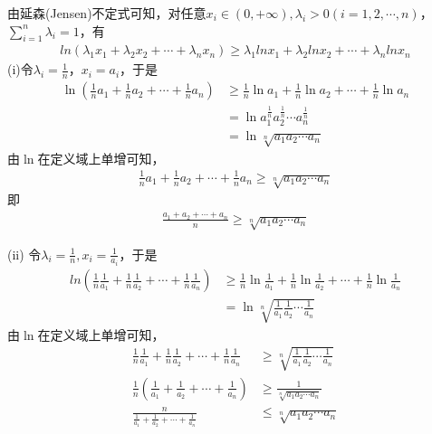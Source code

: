 \documentclass{article}
\begin{document}
由延森(Jensen)不定式可知，对任意$x_i \in (0, +\infty), \lambda_i > 0 (i = 1, 2, \cdots, n)$，
$\sum\limits_{i = 1}^n \lambda_i = 1$，有
\begin{align*}
  ln (\lambda_1 x_1 + \lambda_2 x_2 + \cdots + \lambda_n x_n) \geq \lambda_1 ln x_1 + \lambda_2 ln x_2 + \cdots + \lambda_n ln x_n
\end{align*}
(i)令$\lambda_i = \frac{1}{n}$，$x_i = a_i$，于是
\begin{align*}
  \ln (\frac{1}{n} a_1 + \frac{1}{n} a_2 + \cdots + \frac{1}{n} a_n)
   & \geq \frac{1}{n} \ln a_1 + \frac{1}{n} \ln a_2 + \cdots + \frac{1}{n} \ln a_n \\
   & = \ln a_1^{\frac{1}{n}} a_2^{\frac{1}{n}} \cdots a_n^{\frac{1}{n}}            \\
   & = \ln \sqrt[n]{a_1a_2 \cdots a_n}
\end{align*}
由$\ln$在定义域上单增可知，
\begin{align*}
  \frac{1}{n} a_1 + \frac{1}{n} a_2 + \cdots + \frac{1}{n} a_n \geq \sqrt[n]{a_1a_2 \cdots a_n}
\end{align*}
即
\begin{align*}
  \frac{a_1 + a_2 + \cdots + a_n}{n} \geq \sqrt[n]{a_1a_2 \cdots a_n}
\end{align*}

(ii) 令$\lambda_i = \frac{1}{n}, x_i = \frac{1}{a_i}$，于是
\begin{align*}
  ln (\frac{1}{n} \frac{1}{a_1} + \frac{1}{n} \frac{1}{a_2} + \cdots + \frac{1}{n} \frac{1}{a_n})
   & \geq \frac{1}{n} \ln \frac{1}{a_1} + \frac{1}{n} \ln \frac{1}{a_2} + \cdots + \frac{1}{n} \ln \frac{1}{a_n} \\
   & = \ln \sqrt[n]{\frac{1}{a_1}\frac{1}{a_2} \cdots \frac{1}{a_n}}
\end{align*}
由$\ln$在定义域上单增可知，
\begin{align*}
  \frac{1}{n} \frac{1}{a_1} + \frac{1}{n} \frac{1}{a_2} + \cdots + \frac{1}{n} \frac{1}{a_n}
                                                                      & \geq \sqrt[n]{\frac{1}{a_1}\frac{1}{a_2} \cdots \frac{1}{a_n}} \\
  \frac{1}{n}(\frac{1}{a_1} + \frac{1}{a_2} + \cdots + \frac{1}{a_n}) & \geq \frac{1}{\sqrt[n]{a_1a_2 \cdots a_n}}                     \\
  \frac{n}{\frac{1}{a_1} + \frac{1}{a_2} + \cdots + \frac{1}{a_n}}    & \leq \sqrt[n]{a_1a_2 \cdots a_n}
\end{align*}
\end{document}
